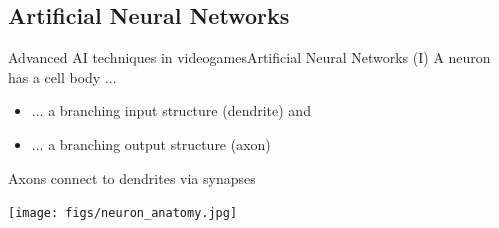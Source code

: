 \documentclass[10pt,compress]{beamer} %
\begin{document}
\subsection{Artificial Neural Networks}
\begin{frame}{Advanced AI techniques in videogames}{Artificial Neural Networks (I)} 
	A neuron has a cell body ...
	\begin{itemize}
	\item ... a branching input structure (dendrite) and 
	\item ... a branching output structure (axon)
	\end{itemize}
	Axons connect to dendrites via synapses
	\smallskip
	\begin{center}
	\texttt{[image: figs/neuron\_anatomy.jpg]}
	\end{center}
\end{frame}
\end{document}
